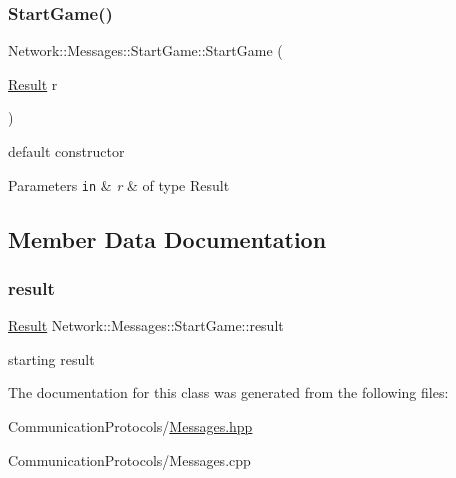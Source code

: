 \subsubsection{\texorpdfstring{Start\+Game()}{StartGame()}}
{\footnotesize\ttfamily Network\+::\+Messages\+::\+Start\+Game\+::\+Start\+Game (\begin{DoxyParamCaption}\item[{\hyperlink{class_network_1_1_messages_1_1_base_a646d774928c7dfac987228f26ab5d46a}{Result}}]{r }\end{DoxyParamCaption})\hspace{0.3cm}{\ttfamily [inline]}}



default constructor 


\begin{DoxyParams}[1]{Parameters}
\mbox{\tt in}  & {\em r} & of type Result \\
\hline
\end{DoxyParams}


\subsection{Member Data Documentation}
\mbox{\label{class_network_1_1_messages_1_1_start_game_a0f8789ffc573d97efb7004ca739fa1e6}} 
\subsubsection{\texorpdfstring{result}{result}}
{\footnotesize\ttfamily \hyperlink{class_network_1_1_messages_1_1_base_a646d774928c7dfac987228f26ab5d46a}{Result} Network\+::\+Messages\+::\+Start\+Game\+::result}

starting result 

The documentation for this class was generated from the following files\+:\begin{DoxyCompactItemize}
\item 
Communication\+Protocols/\hyperlink{_messages_8hpp}{Messages.\+hpp}\item 
Communication\+Protocols/Messages.\+cpp\end{DoxyCompactItemize}
